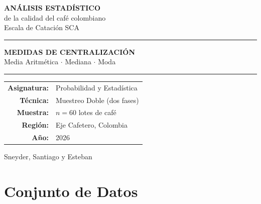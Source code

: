 \documentclass[12pt,a4paper]{article}
\begin{document}

\begin{titlepage}
  \pagecolor{cafeoscuro}
  \color{white}
  \centering
  \vspace*{2cm}

  {\Huge\bfseries\color{cafesuave} ANÁLISIS ESTADÍSTICO}\\[0.3cm]
  {\large\color{white} de la calidad del café colombiano}\\[0.2cm]
  {\large\color{cafesuave} Escala de Catación SCA}

  \vspace{1.5cm}
  \textcolor{cafemedio}{\rule{10cm}{1.5pt}}
  \vspace{1cm}

  {\large\bfseries\color{cafesuave} MEDIDAS DE CENTRALIZACIÓN}\\[0.5cm]
  {\normalsize\color{white} Media Aritmética \quad $\cdot$ \quad Mediana \quad $\cdot$ \quad Moda}

  \vspace{1.5cm}
  \textcolor{cafemedio}{\rule{10cm}{1.5pt}}
  \vspace{1.5cm}

  \begin{center}
    \begin{tabular}{rl}
      \textcolor{cafesuave}{\textbf{Asignatura:}} & Probabilidad y Estadística \\[4pt]
      \textcolor{cafesuave}{\textbf{Técnica:}}    & Muestreo Doble (dos fases) \\[4pt]
      \textcolor{cafesuave}{\textbf{Muestra:}}    & $n = 60$ lotes de café \\[4pt]
      \textcolor{cafesuave}{\textbf{Región:}}     & Eje Cafetero, Colombia \\[4pt]
      \textcolor{cafesuave}{\textbf{Año:}}        & 2026 \\
    \end{tabular}
  \end{center}

  \vfill
  {\small\color{cafesuave} Sneyder, Santiago y Esteban}
\end{titlepage}

\pagecolor{white}
\color{black}

\section{Conjunto de Datos}
\end{document}
